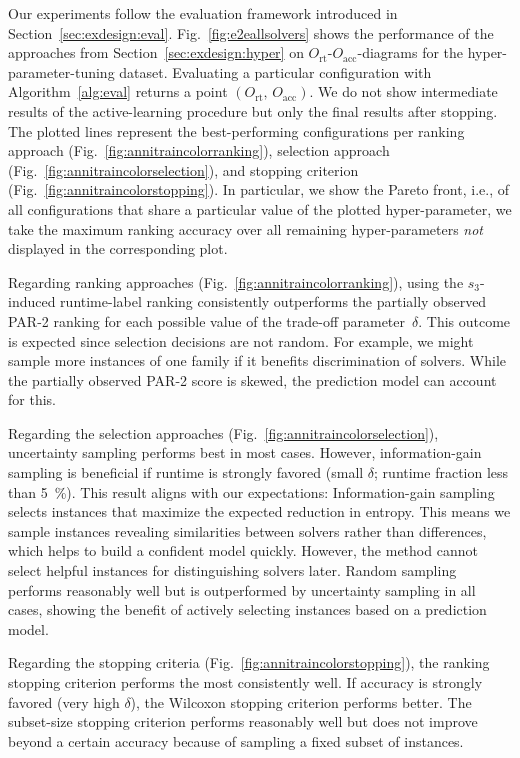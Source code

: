 \documentclass[runningheads]{llncs}
\begin{document}
Our experiments follow the evaluation framework introduced in Section~\ref{sec:exdesign:eval}.
Fig.~\ref{fig:e2eallsolvers} shows the performance of the approaches from Section~\ref{sec:exdesign:hyper} on $O_{\operatorname{rt}}$-$O_{\operatorname{acc}}$-diagrams for the hyper-parameter-tuning dataset.
Evaluating a particular configuration with Algorithm~\ref{alg:eval} returns a point $\left(O_{\operatorname{rt}},\, O_{\operatorname{acc}}\right)$.
We do not show intermediate results of the active-learning procedure but only the final results after stopping.
The plotted lines represent the best-performing configurations per ranking approach (Fig.~\ref{fig:annitraincolorranking}), selection approach (Fig.~\ref{fig:annitraincolorselection}), and stopping criterion (Fig.~\ref{fig:annitraincolorstopping}).
In particular, we show the Pareto front, i.e., of all configurations that share a particular value of the plotted hyper-parameter, we take the maximum ranking accuracy over all remaining hyper-parameters \emph{not} displayed in the corresponding plot.

Regarding ranking approaches (Fig.~\ref{fig:annitraincolorranking}), using the $s_3$-induced runtime-label ranking consistently outperforms the partially observed PAR-2 ranking for each possible value of the trade-off parameter~$\delta$.
This outcome is expected since selection decisions are not random.
For example, we might sample more instances of one family if it benefits discrimination of solvers.
While the partially observed PAR-2 score is skewed, the prediction model can account for this.

Regarding the selection approaches (Fig.~\ref{fig:annitraincolorselection}), uncertainty sampling performs best in most cases.
However, information-gain sampling is beneficial if runtime is strongly favored (small $\delta$; runtime fraction less than \SI{5}{\%}).
This result aligns with our expectations:
Information-gain sampling selects instances that maximize the expected reduction in entropy.
This means we sample instances revealing similarities between solvers rather than differences, which helps to build a confident model quickly.
However, the method cannot select helpful instances for distinguishing solvers later.
Random sampling performs reasonably well but is outperformed by uncertainty sampling in all cases, showing the benefit of actively selecting instances based on a prediction model.

Regarding the stopping criteria (Fig.~\ref{fig:annitraincolorstopping}), the ranking stopping criterion performs the most consistently well.
If accuracy is strongly favored (very high $\delta$), the Wilcoxon stopping criterion performs better.
The subset-size stopping criterion performs reasonably well but does not improve beyond a certain accuracy because of sampling a fixed subset of instances.
\end{document}
